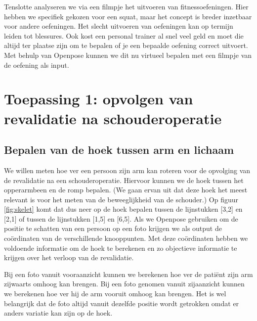 \documentclass[a4paper,twoside,kulak]{kulakreport}
\begin{document}
Tenslotte analyseren we via een filmpje het uitvoeren van fitnessoefeningen. Hier hebben we specifiek gekozen voor een squat, maar het concept is breder inzetbaar voor andere oefeningen. Het slecht uitvoeren van oefeningen kan op termijn leiden tot blessures. Ook kost een personal trainer al snel veel geld en moet die altijd ter plaatse zijn om te bepalen of je een bepaalde oefening correct uitvoert. Met behulp van Openpose kunnen we dit nu virtueel bepalen met een filmpje van de oefening als input.

\section{Toepassing 1: opvolgen van revalidatie na schouderoperatie}
\subsection{Bepalen van de hoek tussen arm en lichaam}

We willen meten hoe ver een persoon zijn arm kan roteren voor de opvolging van de revalidatie na een schouderoperatie. Hiervoor kunnen we de hoek tussen het opperarmbeen en de romp bepalen. (We gaan ervan uit dat deze hoek het meest relevant is voor het meten van de beweeglijkheid van de schouder.) Op figuur \ref{fig:skelet} komt dat dus neer op de hoek bepalen tussen de lijnstukken [3,2] en [2,1] of tussen de lijnstukken [1,5] en [6,5]. Als we Openpose gebruiken om de positie te schatten van een persoon op een foto krijgen we als output de coördinaten van de verschillende knooppunten. Met deze coördinaten hebben we voldoende informatie om de hoek te berekenen en zo objectieve informatie te krijgen over het verloop van de revalidatie.

Bij een foto vanuit vooraanzicht kunnen we berekenen hoe ver de patiënt zijn arm zijwaarts omhoog kan brengen. Bij een foto genomen vanuit zijaanzicht kunnen we berekenen hoe ver hij de arm vooruit omhoog kan brengen. Het is wel belangrijk dat de foto altijd vanuit dezelfde positie wordt getrokken omdat er anders variatie kan zijn op de hoek.
\end{document}
